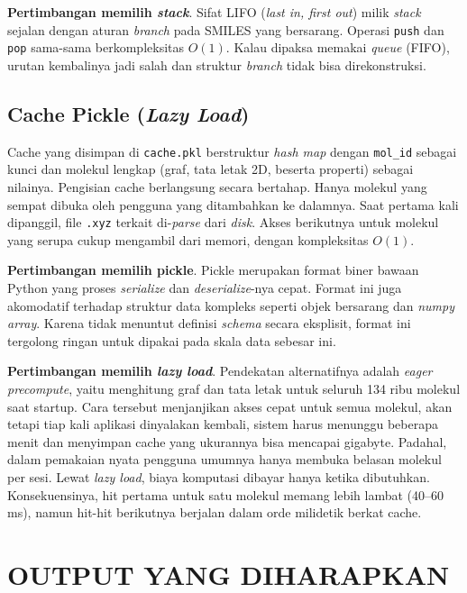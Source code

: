 \documentclass[a4paper,12pt]{report}
\begin{document}
\textbf{Pertimbangan memilih \textit{stack}}. Sifat LIFO (\textit{last in, first out}) milik \textit{stack} sejalan dengan aturan \textit{branch} pada SMILES yang bersarang. Operasi \texttt{push} dan \texttt{pop} sama-sama berkompleksitas $O(1)$. Kalau dipaksa memakai \textit{queue} (FIFO), urutan kembalinya jadi salah dan struktur \textit{branch} tidak bisa direkonstruksi.

\section{Cache Pickle (\textit{Lazy Load})}

Cache yang disimpan di \texttt{cache.pkl} berstruktur \textit{hash map} dengan \texttt{mol\_id} sebagai kunci dan molekul lengkap (graf, tata letak 2D, beserta properti) sebagai nilainya. Pengisian cache berlangsung secara bertahap. Hanya molekul yang sempat dibuka oleh pengguna yang ditambahkan ke dalamnya. Saat pertama kali dipanggil, file \texttt{.xyz} terkait di-\textit{parse} dari \textit{disk}. Akses berikutnya untuk molekul yang serupa cukup mengambil dari memori, dengan kompleksitas $O(1)$.

\textbf{Pertimbangan memilih pickle}. Pickle merupakan format biner bawaan Python yang proses \textit{serialize} dan \textit{deserialize}-nya cepat. Format ini juga akomodatif terhadap struktur data kompleks seperti objek bersarang dan \textit{numpy array}. Karena tidak menuntut definisi \textit{schema} secara eksplisit, format ini tergolong ringan untuk dipakai pada skala data sebesar ini.

\textbf{Pertimbangan memilih \textit{lazy load}}. Pendekatan alternatifnya adalah \textit{eager precompute}, yaitu menghitung graf dan tata letak untuk seluruh 134 ribu molekul saat startup. Cara tersebut menjanjikan akses cepat untuk semua molekul, akan tetapi tiap kali aplikasi dinyalakan kembali, sistem harus menunggu beberapa menit dan menyimpan cache yang ukurannya bisa mencapai gigabyte. Padahal, dalam pemakaian nyata pengguna umumnya hanya membuka belasan molekul per sesi. Lewat \textit{lazy load}, biaya komputasi dibayar hanya ketika dibutuhkan. Konsekuensinya, hit pertama untuk satu molekul memang lebih lambat (40--60 ms), namun hit-hit berikutnya berjalan dalam orde milidetik berkat cache.

\chapter{OUTPUT YANG DIHARAPKAN}
\end{document}
